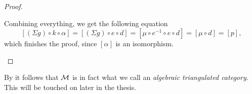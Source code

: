 \begin{proof}
\begin{enumerate}[label={(\bfseries TR\arabic*)}]
{            Combining everything, we get the following equation
            \[
                [(\Sigma g) \circ k \circ \alpha] = [(\Sigma g) \circ e \circ d] =[\mu \circ e^{-1} \circ e \circ d] = [\mu \circ d] = [p],
            \]
            which finishes the proof, since \( [\alpha] \) is an isomorphism. \qedhere
        }
    \end{enumerate}
\end{proof}

By \cite[Lemma, Subsection 7.5]{Krause_2007} it follows that \( {\mathcal{M}} \) is in fact what we call an \emph{algebraic triangulated category}. This will be touched on later in the thesis. %